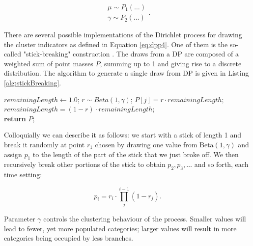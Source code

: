\begin{equation}
\begin{array}{c}
\mu\sim P_{1}(\ldots)\\
\gamma\sim P_{2}(\ldots)
\end{array}.
\label{eq:dpp5}
\end{equation}

There are several possible implementations of the Dirichlet process for drawing the cluster indicators as defined in Equation \ref{eq:dpp4}. 
One of them is the so-called "stick-breaking" construction \citep{Sethuraman94}.
The draws from a DP are composed of a weighted sum of point masses $P$, summing up to 1 and giving rise to a discrete distribution.
The algorithm to generate a single draw from DP is given in Listing \ref{alg:stickBreaking}.

\begin{algorithm}[H]
\begin{center}
\begin{algorithmic}[1]
%
\State $remainingLength \gets 1.0$;
%
%
\State $r\sim Beta\left(1,\gamma\right)$;
%
\State $P\left[j\right]=r \cdot remainingLength$;
%
\State $remainingLength=\left(1-r\right) \cdot remainingLength$;
%
\EndFor \\
%
 \textbf{return} $P$;
\end{algorithmic}
\end{center}
\caption{ 
{ \footnotesize 
{\bf Constructing the Dirichlet process by stick breaking.} 
}%
}
\label{alg:stickBreaking}
\end{algorithm}

Colloquially we can describe it as follows: we start with a stick of length 1 and break it randomly at point $r_{1}$ chosen by drawing one value from $\text{Beta}(1, \gamma)$ and assign $p_{1}$ to the length of the part of the stick that we just broke off.
We then recursively break other portions of the stick to obtain $p_{2}, p_{3}, \ldots$ and so forth, each time setting:

\begin{equation}
p_{i}=r_{i}\cdot\underset{j}{\overset{i-1}{\prod}}\left(1-r_{j}\right).
\label{eq:sticks}
\end{equation}

\noindent
Parameter $\gamma$ controls the clustering behaviour of the process.
Smaller values will lead to fewer, yet more populated categories; larger values will result in more categories being occupied by less branches.


